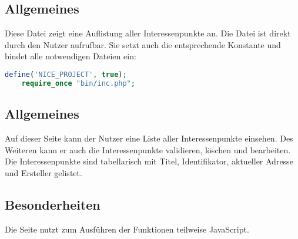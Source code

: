 \subsection{Allgemeines} Diese Datei zeigt eine Auflistung aller Interessenpunkte an.
Die Datei ist direkt durch den Nutzer aufrufbar. Sie setzt auch die entsprechende Konstante und bindet alle notwendigen Dateien ein:
\begin{lstlisting}[language=php]
	define('NICE_PROJECT', true);
	require_once "bin/inc.php";
\end{lstlisting}
\subsection{Allgemeines}
Auf dieser Seite kann der Nutzer eine Liste aller Interessenpunkte einsehen. Des Weiteren kann er auch die Interessenpunkte validieren, löschen und bearbeiten. Die Interessenpunkte sind tabellarisch mit Titel, Identifikator, aktueller Adresse und Ersteller gelistet.
\subsection{Besonderheiten}
Die Seite nutzt zum Ausführen der Funktionen teilweise JavaScript.